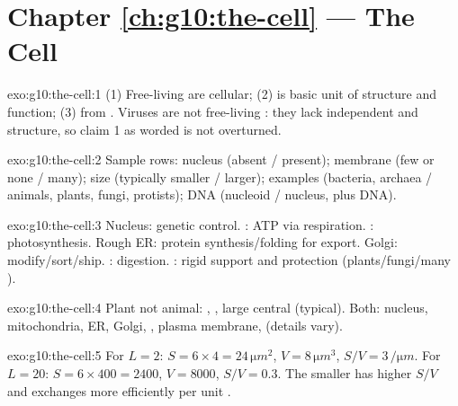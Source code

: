 \section*{Chapter \ref{ch:g10:the-cell} --- The Cell}

\begin{solution}{exo:g10:the-cell:1}
(1) Free-living  are cellular; (2)  is basic unit of
structure and function; (3)  from . Viruses are not free-living
: they lack independent  and  structure, so claim
1 as worded is not overturned.
\end{solution}

\begin{solution}{exo:g10:the-cell:2}
Sample rows: nucleus (absent / present); membrane  (few or none
/ many); size (typically smaller / larger); examples (bacteria, archaea /
animals, plants, fungi, protists); DNA (nucleoid / nucleus, plus 
DNA).
\end{solution}

\begin{solution}{exo:g10:the-cell:3}
Nucleus: genetic control. : ATP via respiration.
: photosynthesis. Rough ER: protein synthesis/folding for
export. Golgi: modify/sort/ship. : digestion. : rigid
support and protection (plants/fungi/many ).
\end{solution}

\begin{solution}{exo:g10:the-cell:4}
Plant not animal: , , large central 
(typical). Both: nucleus, mitochondria, ER, Golgi, , plasma
membrane,  (details vary).
\end{solution}

\begin{solution}{exo:g10:the-cell:5}
For $L=2$: $S=6\times 4=24\,\unit{\micro m^2}$, $V=8\,\unit{\micro m^3}$,
$S/V=3\,\unit{\per\micro m}$. For $L=20$: $S=6\times 400=2400$,
$V=8000$, $S/V=0.3$. The smaller  has higher $S/V$ and exchanges more
efficiently per unit .
\end{solution}

